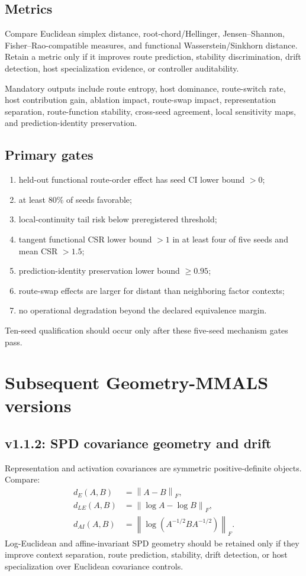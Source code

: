 \documentclass[11pt,a4paper]{article}
\newcommand{\norm}[1]{\left\lVert #1 \right\rVert}
\begin{document}
\subsection{Metrics}
Compare Euclidean simplex distance, root-chord/Hellinger, Jensen--Shannon, Fisher--Rao-compatible measures, and functional Wasserstein/Sinkhorn distance. Retain a metric only if it improves route prediction, stability discrimination, drift detection, host specialization evidence, or controller auditability.

Mandatory outputs include route entropy, host dominance, route-switch rate, host contribution gain, ablation impact, route-swap impact, representation separation, route-function stability, cross-seed agreement, local sensitivity maps, and prediction-identity preservation.

\subsection{Primary gates}
\begin{enumerate}
\item held-out functional route-order effect has seed CI lower bound $>0$;
\item at least 80\% of seeds favorable;
\item local-continuity tail risk below preregistered threshold;
\item tangent functional CSR lower bound $>1$ in at least four of five seeds and mean CSR $>1.5$;
\item prediction-identity preservation lower bound $\ge0.95$;
\item route-swap effects are larger for distant than neighboring factor contexts;
\item no operational degradation beyond the declared equivalence margin.
\end{enumerate}
Ten-seed qualification should occur only after these five-seed mechanism gates pass.

\section{Subsequent Geometry-MMALS versions}
\subsection{v1.1.2: SPD covariance geometry and drift}
Representation and activation covariances are symmetric positive-definite objects. Compare:
\begin{align}
d_E(A,B)&=\norm{A-B}_F,\\
d_{LE}(A,B)&=\norm{\log A-\log B}_F,\\
d_{AI}(A,B)&=\norm{\log(A^{-1/2}BA^{-1/2})}_F.
\end{align}
Log-Euclidean and affine-invariant SPD geometry \cite{bhatia2007positive,pennec2006riemannian} should be retained only if they improve context separation, route prediction, stability, drift detection, or host specialization over Euclidean covariance controls.
\end{document}
